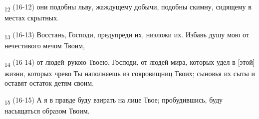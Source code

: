 \begin{tcolorbox}
\textsubscript{12} (16-12) они подобны льву, жаждущему добычи, подобны скимну, сидящему в местах скрытных.
\end{tcolorbox}
\begin{tcolorbox}
\textsubscript{13} (16-13) Восстань, Господи, предупреди их, низложи их. Избавь душу мою от нечестивого мечом Твоим,
\end{tcolorbox}
\begin{tcolorbox}
\textsubscript{14} (16-14) от людей--рукою Твоею, Господи, от людей мира, которых удел в [этой] жизни, которых чрево Ты наполняешь из сокровищниц Твоих; сыновья их сыты и оставят остаток детям своим.
\end{tcolorbox}
\begin{tcolorbox}
\textsubscript{15} (16-15) А я в правде буду взирать на лице Твое; пробудившись, буду насыщаться образом Твоим.
\end{tcolorbox}

